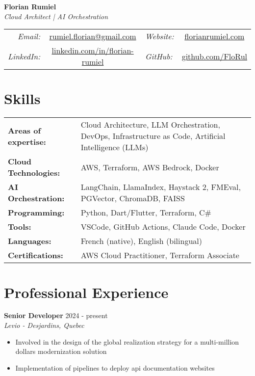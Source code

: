 ﻿\documentclass[11pt,letterpaper]{article}
\begin{document}
\begin{center}
  {\LARGE\textbf{Florian Rumiel}} \\[0.3em]
  {\large\textit{Cloud Architect | AI Orchestration}} \\[0.5em]
  \begin{tabular}{r c l c}
    \textit{Email:} & \href{mailto:rumiel.florian@gmail.com}{rumiel.florian@gmail.com} & \textit{Website:} & \href{https://florian-rumiel.com}{florianrumiel.com} \\
    \textit{LinkedIn:} & \href{https://linkedin.com/in/florian-rumiel}{linkedin.com/in/florian-rumiel} & \textit{GitHub:} & \href{https://github.com/FloRul}{github.com/FloRul} \\
  \end{tabular}
\end{center}

\section*{Skills}
\begin{tabularx}{\textwidth}{@{}l X@{}}
\textbf{Areas of expertise:} & Cloud Architecture, LLM Orchestration, DevOps, Infrastructure as Code, Artificial Intelligence (LLMs) \\[0.2em]
\textbf{Cloud Technologies:} & AWS, Terraform, AWS Bedrock, Docker \\[0.2em]
\textbf{AI Orchestration:} & LangChain, LlamaIndex, Haystack 2, FMEval, PGVector, ChromaDB, FAISS \\[0.2em]
\textbf{Programming:} & Python, Dart/Flutter, Terraform, C\# \\[0.2em]
\textbf{Tools:} & VSCode, GitHub Actions, Claude Code, Docker \\[0.2em]
\textbf{Languages:} & French (native), English (bilingual) \\
\textbf{Certifications:} & AWS Cloud Practitioner, Terraform Associate \\
\end{tabularx}

\section*{Professional Experience}

\textbf{Senior Developer} \hfill 2024 - present\\
\textit{Levio - Desjardins, Quebec}
\begin{itemize}
\item Involved in the design of the global realization strategy for a multi-million dollars modernization solution
\item Implementation of pipelines to deploy api documentation websites
\end{itemize}
\end{document}
